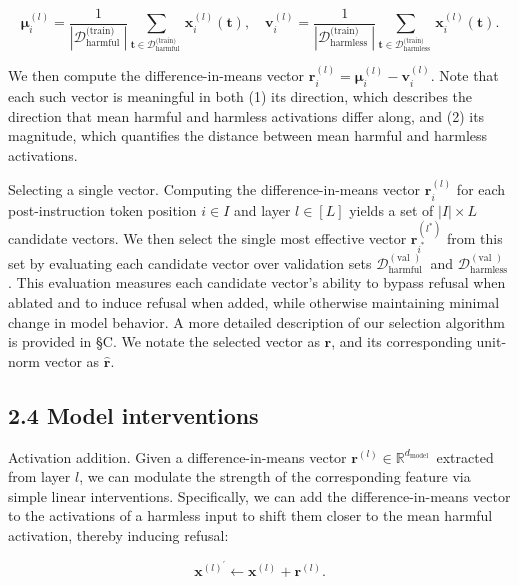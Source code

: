 \documentclass[10pt]{article}
\begin{document}
\begin{equation*}
\boldsymbol{\mu}_{i}^{(l)}=\frac{1}{\left|\mathcal{D}_{\text {harmful }}^{\text {(train) }}\right|} \sum_{\mathbf{t} \in \mathcal{D}_{\text {harmful }}^{\text {(train) }}} \mathbf{x}_{i}^{(l)}(\mathbf{t}), \quad \boldsymbol{v}_{i}^{(l)}=\frac{1}{\left|\mathcal{D}_{\text {harmless }}^{\text {(train) }}\right|} \sum_{\mathbf{t} \in \mathcal{D}_{\text {harmless }}^{\text {(train) }}} \mathbf{x}_{i}^{(l)}(\mathbf{t}) . \tag{2}
\end{equation*}


We then compute the difference-in-means vector $\mathbf{r}_{i}^{(l)}=\boldsymbol{\mu}_{i}^{(l)}-\boldsymbol{v}_{i}^{(l)}$. Note that each such vector is meaningful in both (1) its direction, which describes the direction that mean harmful and harmless activations differ along, and (2) its magnitude, which quantifies the distance between mean harmful and harmless activations.

Selecting a single vector. Computing the difference-in-means vector $\mathbf{r}_{i}^{(l)}$ for each post-instruction token position $i \in I$ and layer $l \in[L]$ yields a set of $|I| \times L$ candidate vectors. We then select the single most effective vector $\mathbf{r}_{i^{*}}^{\left(l^{*}\right)}$ from this set by evaluating each candidate vector over validation sets $\mathcal{D}_{\text {harmful }}^{(\text {val })}$ and $\mathcal{D}_{\text {harmless }}^{(\text {val })}$. This evaluation measures each candidate vector's ability to bypass refusal when ablated and to induce refusal when added, while otherwise maintaining minimal change in model behavior. A more detailed description of our selection algorithm is provided in §C. We notate the selected vector as $\mathbf{r}$, and its corresponding unit-norm vector as $\hat{\mathbf{r}}$.

\subsection*{2.4 Model interventions}
Activation addition. Given a difference-in-means vector $\mathbf{r}^{(l)} \in \mathbb{R}^{d_{\text {model }}}$ extracted from layer $l$, we can modulate the strength of the corresponding feature via simple linear interventions. Specifically, we can add the difference-in-means vector to the activations of a harmless input to shift them closer to the mean harmful activation, thereby inducing refusal:


\begin{equation*}
\mathbf{x}^{(l)^{\prime}} \leftarrow \mathbf{x}^{(l)}+\mathbf{r}^{(l)} . \tag{3}
\end{equation*}
\end{document}

